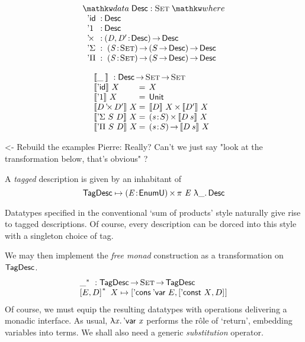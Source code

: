 \documentclass[preprint, authoryear, onecolumn]{sigplanconf}
\newenvironment{structure}{\footnotesize\verbatim}{\endverbatim}
\begin{document}
\[
\stk{
\data \Desc : \Set \where \\
\;\;\begin{array}{@{}l@{\::\:}l@{\quad}l}
    \DId            & \Desc                                   \\
    \DUnit          & \Desc                                   \\
    \DProd{}{}      & \PI{\V{D}, \V{D'}}{\Desc} \Desc         \\
    \DSigma         & \PI{\V{S}}{\Set} \PIS{S \To \Desc} \Desc \\
    \DPi            & \PI{\V{S}}{\Set} \PIS{S \To \Desc} \Desc 
\end{array}
}
\]

\[\stk{
\descop{\_\:}{} : \Desc \To \Set \To \Set \\
\begin{array}{@{}l@{\:=\:\:}ll}
\descop{\DId}{X}          &  X                                           \\
\descop{\DUnit}{X}        &  \Unit                                       \\
\descop{\DProd{D}{D'}}{X} &  \TIMES{\descop{D}{X}}{\descop{D'}{X}}       \\
\descop{\DSigma{S}{D}}{X} &  \SIGMA{\V{s}}{S} \descop{D\: s}{X}                \\
\descop{\DPi{S}{D}}{X}    &  \PI{\V{s}}{S} \descop{D\: s}{X}            
\end{array}
}\]

\begin{structure}
<- Rebuild the examples
Pierre: Really? Can't we just say "look at the transformation below, that's obvious" ?
\end{structure}

A \emph{tagged} description is given by an inhabitant of
\[
 \F{TagDesc} \mapsto \SIGMA{\V{E}}{\EnumU}\spi{\V{E}}{\LAM{\_}\Desc}
\]


Datatypes specified in the conventional `sum of products' style naturally give rise to tagged descriptions. Of course, every description can be dorced into this style with a singleton choice of tag.

We may then implement the \emph{free monad} construction as a
transformation on \(\F{TagDesc}\).
\[\stk{
\FreeMonad{\_} : \F{TagDesc} \To \Set \To \F{TagDesc} \\
\FreeMonad{\pair{E}{D}{}}\:X \mapsto
\pair{\ListCons{\:\DVar{}}{E}}{\pair{\DConst{X}}{D}{}}{}
}\]
Of course, we must equip the resulting datatypes with operations delivering a monadic interface. As usual, \(\LAM{\x}\DVar{\x}\) performs the r\^ole of `return', embedding variables into terms. We shall also need a generic \emph{substitution} operator.
\end{document}

